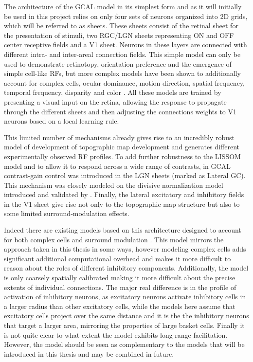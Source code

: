 The architecture of the GCAL model in its simplest form and as it will
initially be used in this project relies on only four sets of neurons
organized into 2D grids, which will be referred to as sheets. These
sheets consist of the retinal sheet for the presentation of stimuli,
two RGC/LGN sheets representing ON and OFF center receptive fields and
a V1 sheet. Neurons in these layers are connected with different
intra- and inter-areal connection fields. This simple model can only
be used to demonstrate retinotopy, orientation preference and the
emergence of simple cell-like RFs, but more complex models have been
shown to additionally account for complex cells, ocular dominance,
motion direction, spatial frequency, temporal frequency, disparity and
color \citep{Bednar2012a}. All these models are trained by presenting
a visual input on the retina, allowing the response to propagate
through the different sheets and then adjusting the connections
weights to V1 neurons based on a local learning rule.

This limited number of mechanisms already gives rise to an incredibly
robust model of development of topographic map development and
generates different experimentally observed RF profiles. To add
further robustness to the LISSOM model and to allow it to respond
across a wide range of contrasts, in GCAL contrast-gain control was
introduced in the LGN sheets (marked as Lateral GC). This mechanism
was closely modeled on the divisive normalization model introduced and
validated by \cite{Bonin2005}. Finally, the lateral excitatory and
inhibitory fields in the V1 sheet give rise not only to the
topographic map structure but also to some limited surround-modulation
effects.

Indeed there are existing models based on this architecture designed
to account for both complex cells and surround modulation
\cite{Antolik2010}. This model mirrors the approach taken in this
thesis in some ways, however modeling complex cells adds significant
additional computational overhead and makes it more difficult to
reason about the roles of different inhibitory
components. Additionally, the model is only coarsely spatially
calibrated making it more difficult about the precise extents of
individual connections. The major real difference is in the profile of
activation of inhibitory neurons, as excitatory neurons activate
inhibitory cells in a larger radius than other excitatory cells, while
the models here assume that excitatory cells project over the same
distance and it is the the inhibitory neurons that target a larger
area, mirroring the properties of large basket cells. Finally it is
not quite clear to what extent the model exhibits long-range
facilitation. However, the model should be seen as complementary to
the models that will be introduced in this thesis and may be combined
in future.

